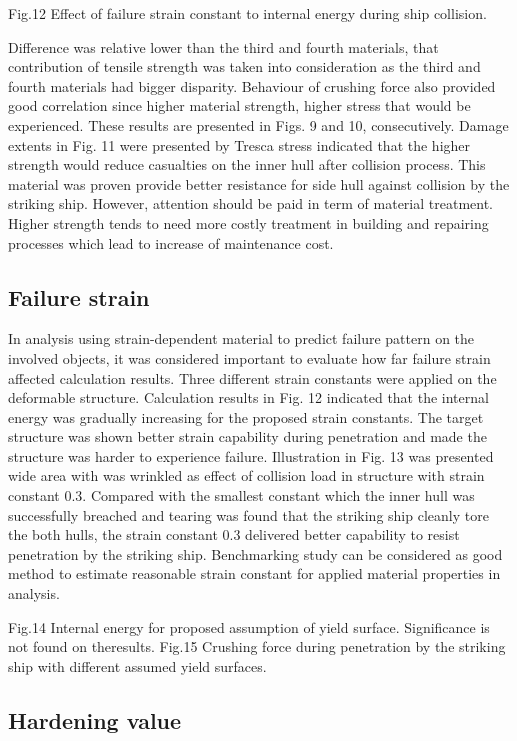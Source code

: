 \documentclass[10pt,journal]{IEEEtran}
\begin{document}
Fig.12 Effect of failure strain constant to internal energy during ship collision. 

Difference was relative lower than the third and fourth materials, that contribution of tensile strength was taken into consideration as the third and fourth materials had bigger disparity. 
Behaviour of crushing force also provided good correlation since higher material strength, higher stress that would be experienced. These results are presented in Figs. 9 and 10, consecutively. 
Damage extents in Fig. 11 were presented by Tresca stress indicated that the higher strength would reduce casualties on the inner hull after collision process. 
This material was proven provide better resistance for side hull against collision by the striking ship. However, attention should be paid in term of material treatment. 
Higher strength tends to need more costly treatment in building and repairing processes which lead to increase of maintenance cost. 

\subsection{Failure strain}

In analysis using strain-dependent material to predict failure pattern on the involved objects, it was considered important to evaluate how far failure strain affected calculation results. 
Three different strain constants were applied on the deformable structure. 
Calculation results in Fig. 12 indicated that the internal energy was gradually increasing for the proposed strain constants. 
The target structure was shown better strain capability during penetration and made the structure was harder to experience failure. Illustration in Fig. 13 was presented wide area with was wrinkled as effect 
of collision load in structure with strain constant 0.3. Compared with the smallest constant which the inner hull was successfully breached and tearing was found that the striking ship cleanly tore the both hulls, 
the strain constant 0.3 delivered better capability to resist penetration by the striking ship. 
Benchmarking study can be considered as good method to estimate reasonable strain constant for applied material properties in analysis. 

Fig.14 Internal energy for proposed assumption of yield surface. Significance is not found on theresults. 
Fig.15 Crushing force during penetration by the striking ship with different assumed yield surfaces.

\subsection{Hardening value}
\end{document}
